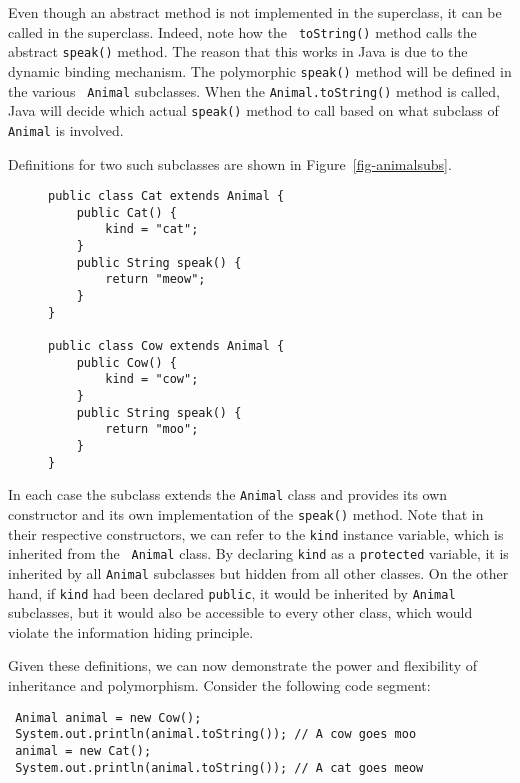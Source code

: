 Even though an abstract method is not implemented in the superclass,
it can be called in the superclass. Indeed, note how the {\tt
toString()} method calls the abstract {\tt speak()} method. The reason
that this works in Java is due to the dynamic binding mechanism.  The
polymorphic {\tt speak()} method will be defined in the various {\tt
Animal} subclasses. When the {\tt Animal.toString()} method is called,
Java will decide which actual {\tt speak()} method to call based on
what subclass of {\tt Animal} is involved.  

Definitions for two such subclasses are shown in
Figure~\ref{fig-animalsubs}.  
\begin{figure}[htb]
\jjjprogstart
\begin{jjjlisting}
\begin{lstlisting}
public class Cat extends Animal {
    public Cat() {
        kind = "cat";
    }
    public String speak() {
        return "meow";
    }
}

public class Cow extends Animal {
    public Cow() {
        kind = "cow";
    }
    public String speak() {
        return "moo";
    }
}
\end{lstlisting}
\end{jjjlisting}
\end{figure}
\noindent In each case the subclass extends the {\tt Animal} class and provides
its own constructor and its own implementation of the {\tt speak()}
method. Note that in their respective constructors, we can refer to
the {\tt kind} instance variable, which is inherited from the {\tt
Animal} class.  By declaring {\tt kind} as a {\tt protected} variable,
it is inherited by all {\tt Animal} subclasses but hidden from
all other classes.  On the other hand, if {\tt kind} had been declared
{\tt public}, it would be inherited by {\tt Animal} subclasses, but it
would also be accessible to every other class, which would violate the
information hiding principle.

Given these definitions, we can now demonstrate the power and
flexibility of inheritance and polymorphism.  Consider the following
code segment:

\begin{jjjlisting}
\begin{lstlisting}
 Animal animal = new Cow();
 System.out.println(animal.toString()); // A cow goes moo
 animal = new Cat();
 System.out.println(animal.toString()); // A cat goes meow
\end{lstlisting}
\end{jjjlisting}

